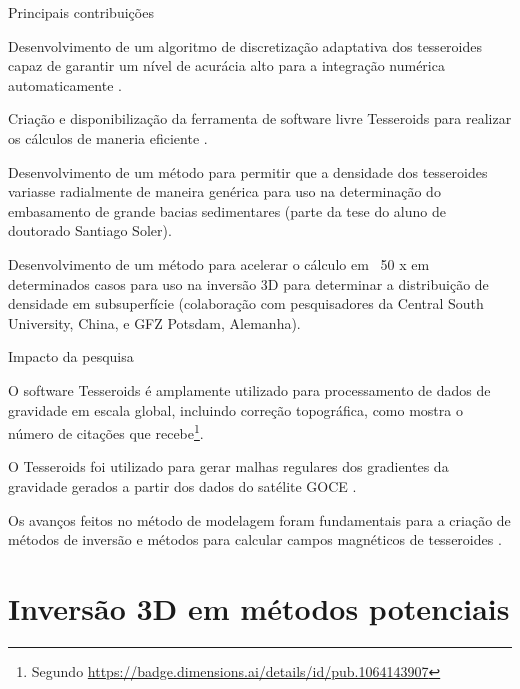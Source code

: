 \documentclass[10pt,a4paper,oneside]{book}
\begin{document}
\begin{fancyenum}{\faLightbulb}{Principais contribuições}
  \item Desenvolvimento de um algoritmo de discretização adaptativa dos
    tesseroides capaz de garantir um nível de acurácia alto para a integração
    numérica automaticamente \citep{Uieda2016}.
  \item Criação e disponibilização da ferramenta de software livre Tesseroids
    para realizar os cálculos de maneria eficiente \citep{Uieda2016}.
  \item Desenvolvimento de um método para permitir que a densidade dos
    tesseroides variasse radialmente de maneira genérica \citep{Soler2019}
    para uso na determinação do embasamento de grande bacias sedimentares
    (parte da tese do aluno de doutorado Santiago Soler).
  \item Desenvolvimento de um método para acelerar o cálculo
    em ~50 x em determinados casos para uso na inversão 3D para determinar a
    distribuição de densidade em subsuperfície \citep{Zhao2019}
    (colaboração com pesquisadores da Central South University, China, e GFZ
    Potsdam, Alemanha).
\end{fancyenum}

\begin{fancyenum}{\faRocket}{Impacto da pesquisa}
  \item O software Tesseroids é amplamente utilizado para processamento de
    dados de gravidade em escala global, incluindo correção topográfica, como
    mostra o número de citações que recebe\footnote{Segundo
    \url{https://badge.dimensions.ai/details/id/pub.1064143907}}.
  \item O Tesseroids foi utilizado para gerar malhas regulares dos gradientes da
    gravidade gerados a partir dos dados do satélite GOCE \citep{Bouman2016}.
  \item Os avanços feitos no método de modelagem foram fundamentais para a
    criação de métodos de inversão \citep{Uieda2017,Zhao2019} e métodos para
    calcular campos magnéticos de tesseroides \citep{Baykiev2016}.
\end{fancyenum}



\section{Inversão 3D em métodos potenciais}
\label{sec_planting}
\end{document}
